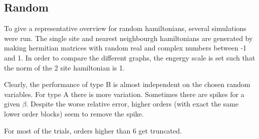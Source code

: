 
\subsection{Random}

To give a representative overview for random hamiltonians, several simulations were run. The single site and nearest neighbourgh hamiltonians are generated by making hermitian matrices with random real and complex numbers between -1 and 1. In order to compare the different graphs, the engergy scale is set such that the norm of the 2 site hamiltonian is 1.


Clearly, the performance of type B is almost independent on the chosen random variables. For type A there is more variation. Sometimes there are spikes for a given $\beta$. Despite the worse relative error, higher orders (with exact the same lower order blocks) seem to remove the spike.

For most of the trials, orders higher than 6 get truncated.

